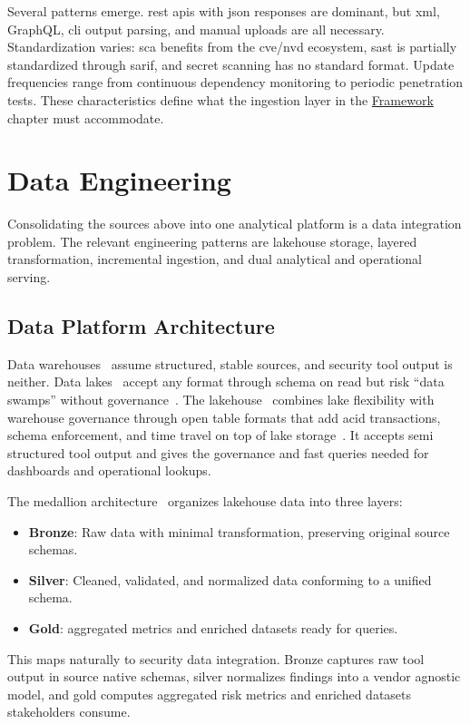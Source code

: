 Several patterns emerge. \gls{rest} \glspl{api} with \gls{json} responses are dominant, but \gls{xml}, GraphQL, \gls{cli} output parsing, and manual uploads are all necessary. Standardization varies: \gls{sca} benefits from the \gls{cve}/\gls{nvd} ecosystem, \gls{sast} is partially standardized through \gls{sarif}, and secret scanning has no standard format. Update frequencies range from continuous dependency monitoring to periodic penetration tests. These characteristics define what the ingestion layer in the \hyperref[ch:framework]{Framework} chapter must accommodate.


\section{Data Engineering}

Consolidating the sources above into one analytical platform is a data integration problem. The relevant engineering patterns are lakehouse storage, layered transformation, incremental ingestion, and dual analytical and operational serving.


\subsection{Data Platform Architecture}
\label{sec:data-architecture}

Data warehouses~\cite{Inmon2005, Kimball2013} assume structured, stable sources, and security tool output is neither. Data lakes~\cite{Miloslavskaya2016} accept any format through schema on read but risk ``data swamps'' without governance~\cite{DAMA2017}. The lakehouse~\cite{Armbrust2021} combines lake flexibility with warehouse governance through open table formats that add \gls{acid} transactions, schema enforcement, and time travel on top of lake storage~\cite{Lee2024, Thalpati2024}. It accepts semi structured tool output and gives the governance and fast queries needed for dashboards and operational lookups.

The medallion architecture~\cite{Strengholt2025} organizes lakehouse data into three layers:
\begin{itemize}
    \item \textbf{Bronze}: Raw data with minimal transformation, preserving original source schemas.
    \item \textbf{Silver}: Cleaned, validated, and normalized data conforming to a unified schema.
    \item \textbf{Gold}: aggregated metrics and enriched datasets ready for queries.
\end{itemize}
This maps naturally to security data integration. Bronze captures raw tool output in source native schemas, silver normalizes findings into a vendor agnostic model, and gold computes aggregated risk metrics and enriched datasets stakeholders consume.

